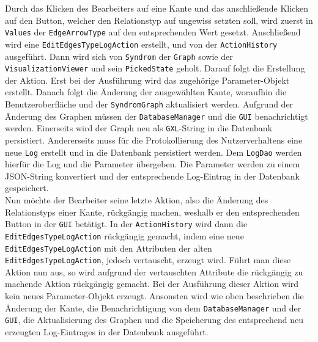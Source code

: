 \documentclass[enabledeprecatedfontcommands,fontsize=11pt,paper=a4,twoside]{scrartcl}
\begin{document}
Durch das Klicken des Bearbeiters auf eine Kante und das anschließende Klicken auf den Button, welcher den Relationstyp auf ungewiss setzten soll, wird zuerst in \texttt{Values} der \texttt{EdgeArrowType} auf den entsprechenden Wert gesetzt. Anschließend wird eine \texttt{EditEdgesTypeLogAction} erstellt, und von der \texttt{ActionHistory} ausgeführt. Dann wird sich von \texttt{Syndrom} der \texttt{Graph} sowie der \texttt{VisualizationViewer} und sein \texttt{PickedState} geholt. Darauf folgt die Erstellung der Aktion. Erst bei der Ausführung wird das  zugehörige Parameter-Objekt erstellt. Danach folgt die Änderung der ausgewählten Kante, woraufhin die Benutzeroberfläche und der \texttt{SyndromGraph} aktualisiert werden. Aufgrund der Änderung des Graphen müssen der \texttt{DatabaseManager} und die \texttt{GUI} benachrichtigt werden. Einerseits wird der Graph neu als \texttt{GXL}-String in die Datenbank persistiert. Andererseits muss für die Protokollierung des Nutzerverhaltens eine neue \texttt{Log} erstellt und in die Datenbank persistiert werden. Dem \texttt{LogDao} werden hierfür die Log und die Parameter übergeben. Die Parameter werden zu einem JSON-String konvertiert und der entsprechende Log-Eintrag in der Datenbank gespeichert.  \\

Nun möchte der Bearbeiter seine letzte Aktion, also die Änderung des Relationstyps einer Kante, rückgängig machen, weshalb er den entsprechenden Button in der \texttt{GUI} betätigt. In der \texttt{ActionHistory} wird dann die \texttt{EditEdgesTypeLogAction} rückgängig gemacht, indem eine neue \texttt{EditEdgesTypeLogAction} mit den Attributen der alten \texttt{EditEdgesTypeLogAction}, jedoch vertauscht, erzeugt wird. Führt man diese Aktion nun aus, so wird aufgrund der vertauschten Attribute die rückgängig zu machende Aktion rückgängig gemacht. Bei der Ausführung dieser Aktion wird kein neues Parameter-Objekt erzeugt. Ansonsten wird wie oben beschrieben die Änderung der Kante, die Benachrichtigung von dem \texttt{DatabaseManager} und der \texttt{GUI}, die Aktualisierung des Graphen und die Speicherung des entsprechend neu erzeugten Log-Eintrages in der Datenbank ausgeführt. 




\end{document}

